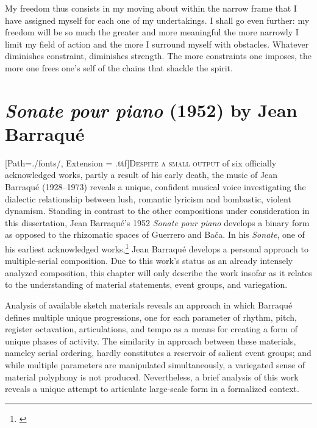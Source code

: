 \begin{savequote}[75mm]
My freedom thus consists in my moving about within the narrow frame that I have assigned myself for each one of my undertakings. I shall go even further: my freedom will be so much the greater and more meaningful the more narrowly I limit my field of action and the more I surround myself with obstacles. Whatever diminishes constraint, diminishes strength. The more constraints one imposes, the more one frees one's self of the chains that shackle the spirit.
\end{savequote}

\chapter{\textit{Sonate pour piano} (1952) by Jean Barraqué}%
\label{Chapter1a}
\lettrine[lines=3]{\setmainfont{GoudyInitialen}[Path=./fonts/, Extension = .ttf]\color{printGreen}D}{espite a small output} of six officially acknowledged works, partly a result of his early death, the music of Jean Barraqué (1928–1973) reveals a unique, confident musical voice investigating the dialectic relationship between lush, romantic lyricism and bombastic, violent dynamism. Standing in contrast to the other compositions under consideration in this dissertation, Jean Barraqué's 1952 \textit{Sonate pour piano} develops a binary form as opposed to the rhizomatic spaces of Guerrero and Bača. In his \textit{Sonate}, one of his earliest acknowledged works,\footnote{\citet[36]{barraque-griffiths}} Jean Barraqué develops a personal approach to multiple-serial composition. Due to this work's status as an already intensely analyzed composition, this chapter will only describe the work insofar as it relates to the understanding of material statements, event groups, and variegation.

Analysis of available sketch materials reveals an approach in which Barraqué defines multiple unique progressions, one for each parameter of rhythm, pitch, register octavation, articulations, and tempo as a means for creating a form of unique phases of activity. The similarity in approach between these materials, nameley serial ordering, hardly constitutes a reservoir of salient event groups; and while multiple parameters are manipulated simultaneously, a variegated sense of material polyphony is not produced. Nevertheless, a brief analysis of this work reveals a unique attempt to articulate large-scale form in a formalized context.

